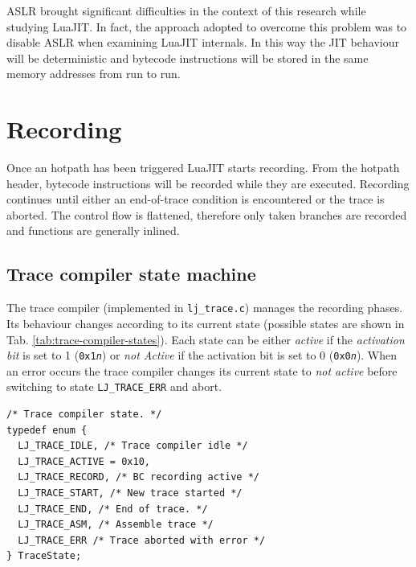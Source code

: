 ASLR brought significant difficulties in the context of this research while studying LuaJIT. In fact, the approach adopted to overcome this problem was to disable ASLR when examining LuaJIT internals. In this way the JIT behaviour will be deterministic and bytecode instructions will be stored in the same memory addresses from run to run.

\section{Recording}
Once an hotpath has been triggered LuaJIT starts recording. From the hotpath header, bytecode instructions will be recorded while they are executed. Recording continues until either an end-of-trace condition is encountered or the trace is aborted. The control flow is flattened, therefore only taken branches are recorded and functions are generally inlined.

\subsection{Trace compiler state machine}
\label{trace-compiler-states}
The trace compiler (implemented in \texttt{lj\_trace.c}) manages the recording phases. Its behaviour changes according to its current state (possible states are shown in Tab. \ref{tab:trace-compiler-states}). Each state can be either \textit{active} if the \textit{activation bit} is set to 1 (\texttt{0x1\textit{n}}) or \textit{not Active} if the activation bit is set to 0 (\texttt{0x0\textit{n}}). When an error occurs the trace compiler changes its current state to \textit{not active} before switching to state \texttt{LJ\_TRACE\_ERR} and abort.


\begin{lstlisting}[style=CStyle, caption=\texttt{lj\_jit.h}]
/* Trace compiler state. */
typedef enum {
  LJ_TRACE_IDLE, /* Trace compiler idle */
  LJ_TRACE_ACTIVE = 0x10,
  LJ_TRACE_RECORD, /* BC recording active */
  LJ_TRACE_START, /* New trace started */
  LJ_TRACE_END, /* End of trace. */
  LJ_TRACE_ASM, /* Assemble trace */
  LJ_TRACE_ERR /* Trace aborted with error */
} TraceState;
\end{lstlisting}

